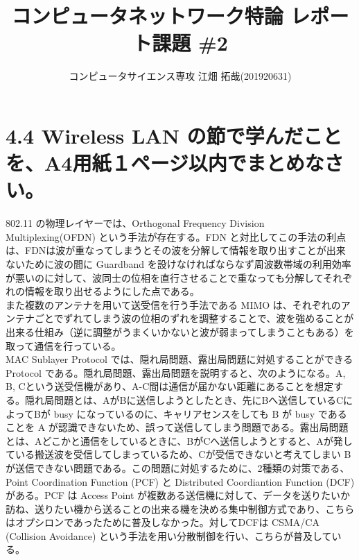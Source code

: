 \documentclass[a4paper, dvipdfmx, 10pt, twocolumn]{article}
\author{コンピュータサイエンス専攻 江畑 拓哉(201920631)}
\date{}
\title{コンピュータネットワーク特論 レポート課題 \#2}
\begin{document}
\maketitle
\section{4.4 Wireless LAN の節で学んだことを、A4用紙１ページ以内でまとめなさい。}
\label{sec:org107236d}
802.11 の物理レイヤーでは、Orthogonal Frequency Division Multiplexing(OFDN) という手法が存在する。FDN と対比してこの手法の利点は、FDNは波が重なってしまうとその波を分解して情報を取り出すことが出来ないために波の間に Guardband を設けなければならなず周波数帯域の利用効率が悪いのに対して、波同士の位相を直行させることで重なっても分解してそれぞれの情報を取り出せるようにした点である。\\

また複数のアンテナを用いて送受信を行う手法である MIMO は、それぞれのアンテナごとでずれてしまう波の位相のずれを調整することで、波を強めることが出来る仕組み（逆に調整がうまくいかないと波が弱まってしまうこともある）を取って通信を行っている。\\

MAC Sublayer Protocol では、隠れ局問題、露出局問題に対処することができる Protocol である。隠れ局問題、露出局問題を説明すると、次のようになる。A, B, Cという送受信機があり、A-C間は通信が届かない距離にあることを想定する。隠れ局問題とは、AがBに送信しようとしたとき、先にBへ送信しているCによってBが busy になっているのに、キャリアセンスをしても B が busy であることを A が認識できないため、誤って送信してしまう問題である。露出局問題とは、Aどこかと通信をしているときに、BがCへ送信しようとすると、Aが発している搬送波を受信してしまっているため、Cが受信できないと考えてしまい B が送信できない問題である。この問題に対処するために、2種類の対策である、Point Coordination Function (PCF) と Distributed Coordiantion Function (DCF) がある。PCF は Access Point が複数ある送信機に対して、データを送りたいか訪ね、送りたい機から送ることの出来る機を決める集中制御方式であり、こちらはオプシロンであったために普及しなかった。対してDCFは CSMA/CA (Collision Avoidance) という手法を用い分散制御を行い、こちらが普及している。\\
\end{document}
